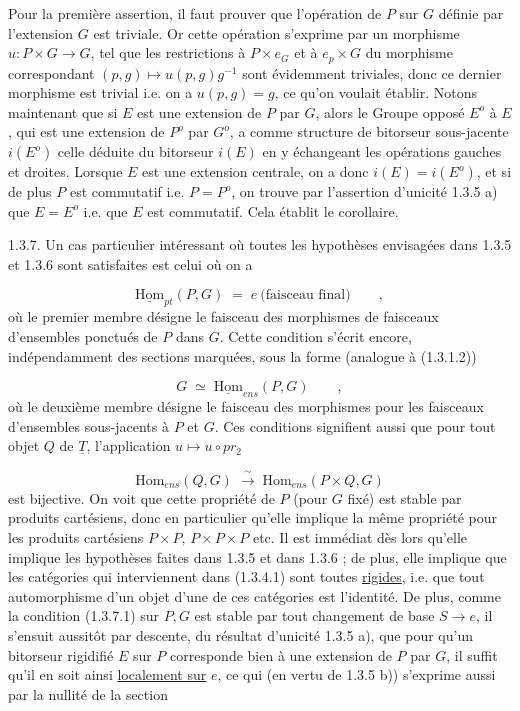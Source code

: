 Pour la première assertion, il faut prouver que l'opération de $P$ sur $G$ définie par l'extension $G$ est triviale. Or cette opération s'exprime par un morphisme $u : P\times G \longrightarrow G$, tel que les restrictions à $P\times e_G$ et à $e_p\times G$ du morphisme correspondant $(p,g) \longmapsto u(p,g)g^{-1}$ sont évidemment triviales, donc ce dernier morphisme est trivial i.e. on a $u(p,g) = g$, ce qu'on voulait établir. Notons maintenant que si $E$ est une extension de $P$ par $G$, alors le Groupe opposé $E^o$ à $E$, qui est une extension de $P^o$ par $G^o$, a comme structure de bitorseur sous-jacente $i(E^o)$ celle déduite du bitorseur $i(E)$ en y échangeant les opérations gauches et droites. Lorsque $E$ est une extension centrale, on a donc $i(E)=i(E^o)$, et si de plus $P$ est commutatif i.e. $P=P^o$, on trouve par l'assertion d'unicité 1.3.5 a) que $E=E^o$ i.e. que $E$ est commutatif. Cela établit le corollaire.



1.3.7. Un cas particulier intéressant où toutes les hypothèses envisagées dans 1.3.5 et 1.3.6 sont satisfaites est celui où on a

\begin{equation}\tag{1.3.7.1}
\underline{\mathrm{Hom}}_{pt}(P,G) \;=\; e \ \text{(faisceau final)} \qquad ,
\end{equation}
où le premier membre désigne le faisceau des morphismes de faisceaux d'ensembles ponctués de $P$ dans $G$. Cette condition s'écrit encore, indépendamment des sections marquées, sous la forme (analogue à (1.3.1.2))

\begin{equation}\tag{1.3.7.2}
G \;\simeq\; \underline{\mathrm{Hom}}_{ens}(P,G) \qquad ,
\end{equation}
où le deuxième membre désigne le faisceau des morphismes pour les faisceaux d'ensembles sous-jacents à $P$ et $G$. Ces conditions signifient aussi que pour tout objet $Q$ de $\underline{T}$, l'application $u \longmapsto u\circ pr_2$

\begin{equation}\tag{1.3.7.3}
\mathrm{Hom}_{ens}(Q,G) \;\xrightarrow{\ \sim\ }\; \mathrm{Hom}_{ens}(P\times Q,G)
\end{equation}
est bijective. On voit que cette propriété de $P$ (pour $G$ fixé) est stable par produits cartésiens, donc en particulier qu'elle implique la même propriété pour les produits cartésiens $P\times P$, $P\times P\times P$ etc. Il est immédiat dès lors qu'elle implique les hypothèses faites dans 1.3.5 et dans 1.3.6 ; de plus, elle implique que les catégories qui interviennent dans (1.3.4.1) sont toutes \underline{rigides}, i.e. que tout automorphisme d'un objet d'une de ces catégories est l'identité. De plus, comme la condition (1.3.7.1) sur $P,G$ est stable par tout changement de base $S \longrightarrow e$, il s'ensuit aussitôt par descente, du résultat d'unicité 1.3.5 a), que pour qu'un bitorseur rigidifié $E$ sur $P$ corresponde bien à une extension de $P$ par $G$, il suffit qu'il en soit ainsi \underline{localement sur} $e$, ce qui (en vertu de 1.3.5 b)) s'exprime aussi par la nullité de la section

